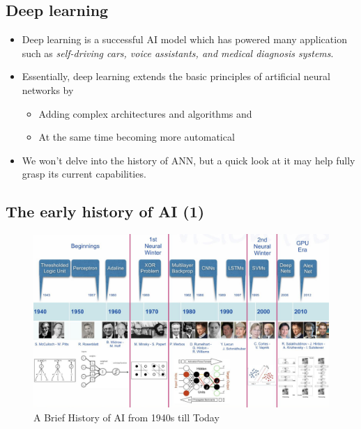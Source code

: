 \documentclass[
  letterpaper,
  DIV=11,
  numbers=noendperiod]{scrartcl}
\providecommand{\tightlist}{%
  \setlength{\itemsep}{0pt}\setlength{\parskip}{0pt}}\usepackage{longtable,booktabs,array}
\begin{document}
\hypertarget{deep-learning}{%
\subsection{Deep learning}\label{deep-learning}}

\begin{itemize}
\item
  Deep learning is a successful AI model which has powered many
  application such as \emph{self-driving cars, voice assistants, and
  medical diagnosis systems}.
\item
  Essentially, deep learning extends the basic principles of artificial
  neural networks by

  \begin{itemize}
  \tightlist
  \item
    Adding complex architectures and algorithms and
  \item
    At the same time becoming more automatical
  \end{itemize}
\item
  We won't delve into the history of ANN, but a quick look at it may
  help fully grasp its current capabilities.
\end{itemize}

\hypertarget{the-early-history-of-ai-1}{%
\subsection{The early history of AI
(1)}\label{the-early-history-of-ai-1}}

\begin{figure}

{\centering \includegraphics[width=1\textwidth,height=\textheight]{images/AIHistory1.jpg}

}

\caption{A Brief History of AI from 1940s till Today}

\end{figure}
\end{document}
